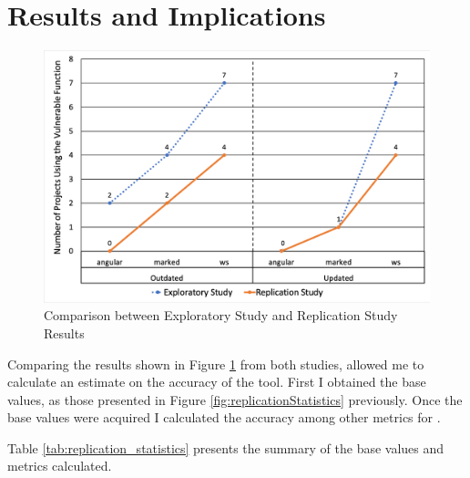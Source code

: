 \section{Results and Implications}
\begin{figure}[ht]
\centering
\includegraphics[width=1\textwidth]{images/studies_comp_graph3.png}
\caption{Comparison between Exploratory Study and Replication Study Results}
\label{fig:replicationResults}
\end{figure}
Comparing the results shown in Figure \ref{fig:replicationResults} from both studies, allowed me to calculate an estimate on the accuracy of the tool. First I obtained the base values, as those presented in Figure \ref{fig:replicationStatistics} previously. Once the base values were acquired I calculated the accuracy among other metrics for \tool[]. 

Table \ref{tab:replication_statistics} presents the summary of the base values and metrics calculated.

